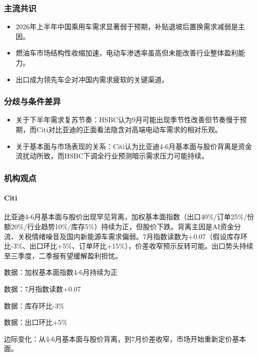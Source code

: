\documentclass[11pt]{ctexart}
\begin{document}
\subsubsection*{主流共识}
\begin{itemize}
  \item 2026年上半年中国乘用车需求显著弱于预期，补贴退坡后置换需求减弱是主因。
  \item 燃油车市场结构性收缩加速，电动车渗透率虽高但未能改善行业整体盈利能力。
  \item 出口成为领先车企对冲国内需求疲软的关键渠道。
\end{itemize}
\subsubsection*{分歧与条件差异}
\begin{itemize}
  \item 关于下半年需求复苏节奏：HSBC认为9月可能出现季节性改善但节奏慢于预期，而Citi对比亚迪的正面看法隐含对高端电动车需求的相对乐观。
  \item 关于基本面与市场表现的关系：Citi认为比亚迪4-6月基本面与股价背离是资金流扰动所致，而HSBC下调全行业预测暗示需求压力可能持续。
\end{itemize}
\subsubsection*{机构观点}
\paragraph{Citi} 比亚迪4-6月基本面与股价出现罕见背离，加权基本面指数（出口40\%/订单25\%/份额20\%/行业趋势10\%/库存5\%）持续为正，但股价下跌。背离主因是AI资金分流、关税情绪噪音及国内新能源车需求偏弱。7月指数读数为+0.07（假设库存环比-3\%、出口环比+5\%、订单环比+15\%），价差收窄预示反转可能。出口势头持续至三季度，二季报有望缓解盈利担忧。
{\small\color{refgray}数据：加权基本面指数4-6月持续为正\par}
{\small\color{refgray}数据：7月指数读数+0.07\par}
{\small\color{refgray}数据：库存环比-3\%\par}
{\small\color{refgray}数据：出口环比+5\%\par}
{\small\color{refgray}边际变化：从4-6月基本面与股价背离，到7月价差收窄，市场开始重新定价基本面。\par}
\end{document}
